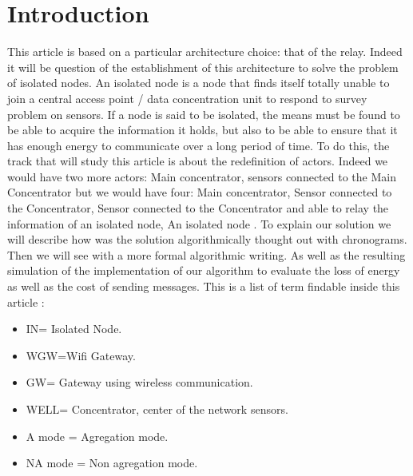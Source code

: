 \documentclass[conference]{IEEEtran}
\begin{document}
\section{Introduction}
This article is based on a particular architecture choice: that of the relay. Indeed it will be question of the establishment of this architecture to solve the problem of isolated nodes. An isolated node is a node that finds itself totally unable to join a central access point / data concentration unit to respond to survey problem on sensors. If a node is said to be isolated, the means must be found to be able to acquire the information it holds, but also to be able to ensure that it has enough energy to communicate over a long period of time. To do this, the track that will study this article is about the redefinition of actors. Indeed we would have two more actors: Main concentrator, sensors connected to the Main Concentrator but we would have four: Main concentrator, Sensor connected to the Concentrator, Sensor connected to the Concentrator and able to relay the information of an isolated node, An isolated node .
To explain our solution we will describe how was the solution algorithmically thought out with chronograms. Then we will see with a more formal algorithmic writing. As well as the resulting simulation of the implementation of our algorithm to evaluate the loss of energy as well as the cost of sending messages.
This is a list of term findable inside this article :
\begin{itemize}
\item IN= Isolated Node.
\item WGW=Wifi Gateway.
\item GW= Gateway using wireless communication.
\item WELL= Concentrator, center of the network sensors.
\item A mode = Agregation mode.
\item NA mode = Non agregation mode.
\end{itemize}
\end{document}
